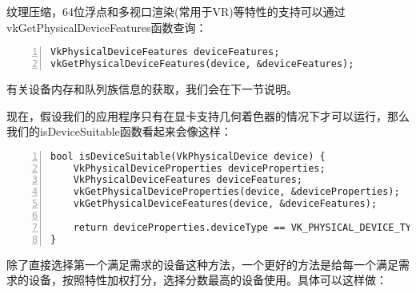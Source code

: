 \documentclass{ctexart}
\begin{document}
纹理压缩，64位浮点和多视口渲染(常用于VR)等特性的支持可以通过vkGetPhysicalDeviceFeatures函数查询：

\begin{lstlisting}[language={[ANSI]C},keywordstyle=\color{blue!70},commentstyle=\color{red!50!green!50!blue!50},frame=shadowbox, rulesepcolor=\color{red!20!green!20!blue!20},basicstyle=\small,numbers=left, numberstyle=\tiny,breaklines=true]
VkPhysicalDeviceFeatures deviceFeatures;
vkGetPhysicalDeviceFeatures(device, &deviceFeatures);
\end{lstlisting}

有关设备内存和队列族信息的获取，我们会在下一节说明。

现在，假设我们的应用程序只有在显卡支持几何着色器的情况下才可以运行，那么我们的isDeviceSuitable函数看起来会像这样：

\begin{lstlisting}[language={[ANSI]C},keywordstyle=\color{blue!70},commentstyle=\color{red!50!green!50!blue!50},frame=shadowbox, rulesepcolor=\color{red!20!green!20!blue!20},basicstyle=\small,numbers=left, numberstyle=\tiny,breaklines=true]
bool isDeviceSuitable(VkPhysicalDevice device) {
	VkPhysicalDeviceProperties deviceProperties;
	VkPhysicalDeviceFeatures deviceFeatures;
	vkGetPhysicalDeviceProperties(device, &deviceProperties);
	vkGetPhysicalDeviceFeatures(device, &deviceFeatures);

	return deviceProperties.deviceType == VK_PHYSICAL_DEVICE_TYPE_DISCRETE_GPU && deviceFeatures.geometryShader;
}
\end{lstlisting}

除了直接选择第一个满足需求的设备这种方法，一个更好的方法是给每一个满足需求的设备，按照特性加权打分，选择分数最高的设备使用。具体可以这样做：
\end{document}
